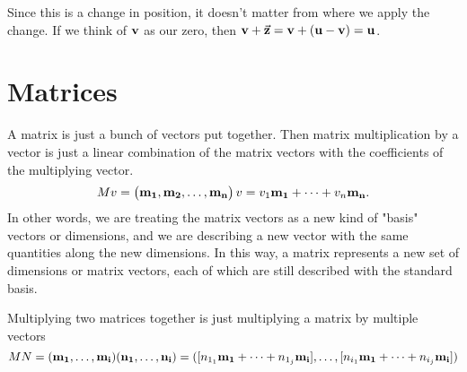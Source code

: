 \documentclass[../main.tex]{subfiles}
\begin{document}
Since this is a change in position,
it doesn't matter from where we apply the change.
If we think of \( \vb{v} \) as our zero,
then \( \vb v + \va z = \vb v + ( \vb u - \vb v ) = \vb u \).

\section{Matrices}

A matrix is just a bunch of vectors put together.
Then matrix multiplication by a vector is just a linear combination of the matrix vectors
with the coefficients of the multiplying vector.
\[ Mv = 
    \begin{pmatrix}
    \vb{m_1}, \vb{m_2}, \dots, \vb{m_n}
    \end{pmatrix}
    v
    = v_1 \vb{m_1} + \dots + v_n \vb{m_n}.
\]
In other words,
we are treating the matrix vectors as a new kind of "basis" vectors or dimensions,
and we are describing a new vector with the same quantities along the new dimensions.
In this way, a matrix represents a new set of dimensions or matrix vectors,
each of which are still described with the standard basis.

\noindent


Multiplying two matrices together is just multiplying a matrix by multiple vectors
\[ MN = (\vb{m_1}, \dots, \vb{m_i})(\vb{n_1}, \dots, \vb{n_i})
    = ([n_{1_1} \vb{m_1} + \dots + n_{1_j} \vb{m_i}], \dots, 
       [n_{i_1} \vb{m_1} + \dots + n_{i_j} \vb{m_i}])
\]
\end{document}
